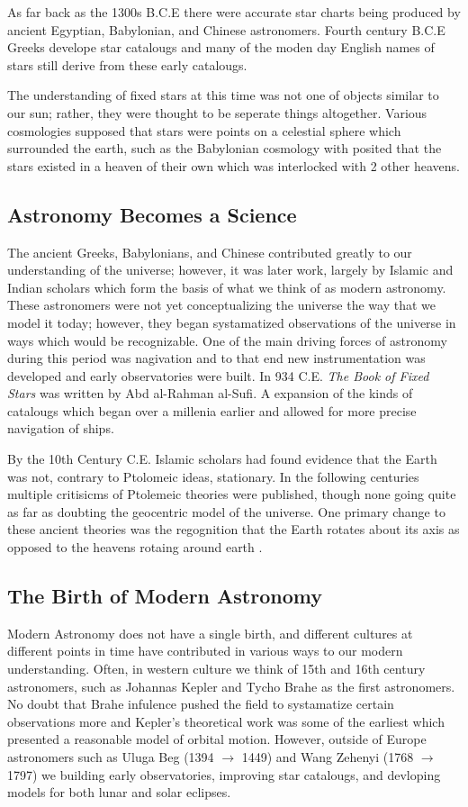 As far back as the 1300s B.C.E there were accurate star charts being produced
by ancient Egyptian, Babylonian, and Chinese astronomers. Fourth century B.C.E
Greeks develope star catalougs and many of the moden day English names of stars
still derive from these early catalougs.

The understanding of fixed stars at this time was not one of objects similar to
our sun; rather, they were thought to be seperate things altogether. Various
cosmologies supposed that stars were points on a celestial sphere which
surrounded the earth, such as the Babylonian cosmology with posited that the
stars existed in a heaven of their own which was interlocked with 2 other
heavens.

\subsection{Astronomy Becomes a Science}
The ancient Greeks, Babylonians, and Chinese contributed greatly to our
understanding of the universe; however, it was later work, largely by Islamic
and Indian scholars which form the basis of what we think of as modern
astronomy. These astronomers were not yet conceptualizing the universe the way
that we model it today; however, they began systamatized observations of the
universe in ways which would be recognizable. One of the main driving forces of
astronomy during this period was nagivation and to that end new instrumentation
was developed and early observatories were built. In 934 C.E. \textit{The Book
of Fixed Stars} was written by Abd al-Rahman al-Sufi. A expansion of the kinds
of catalougs which began over a millenia earlier and allowed for more precise
navigation of ships. 

By the 10th Century C.E. Islamic scholars had found evidence that the Earth was not,
contrary to Ptolomeic ideas, stationary. In the following centuries multiple 
critisicms of Ptolemeic theories were published, though none going quite as far
as doubting the geocentric model of the universe. One primary change to these
ancient theories was the regognition that the Earth rotates about its axis 
as opposed to the heavens rotaing around earth \addcite. 

\subsection{The Birth of Modern Astronomy}
Modern Astronomy does not have a single birth, and different cultures at
different points in time have contributed in various ways to our modern
understanding. Often, in western culture we think of 15th and 16th century
astronomers, such as Johannas Kepler and Tycho Brahe as the first astronomers.
No doubt that Brahe infulence pushed the field to systamatize certain
observations more and Kepler's theoretical work was some of the earliest which
presented a reasonable model of orbital motion. However, outside of Europe
astronomers such as Uluga Beg (1394 $\rightarrow$ 1449) and Wang Zehenyi (1768
$\rightarrow$ 1797) we building early observatories, improving star catalougs,
and devloping models for both lunar and solar eclipses.


